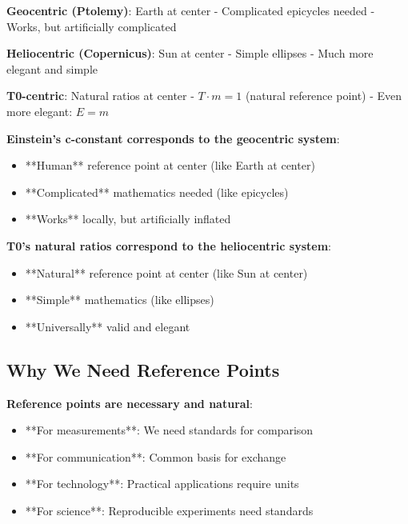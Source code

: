 \documentclass[12pt,a4paper]{article}
\newcommand{\Tfield}{T}
\begin{document}
{{{{{						\begin{tcolorbox}[colback=blue!5!white,colframe=blue!75!black,title=The Reference Point Revolution: From Earth → Sun → Nature]
							\textbf{Geocentric (Ptolemy)}: Earth at center
							- Complicated epicycles needed
							- Works, but artificially complicated
							
							\textbf{Heliocentric (Copernicus)}: Sun at center  
							- Simple ellipses
							- Much more elegant and simple
							
							\textbf{T0-centric}: Natural ratios at center
							- $\Tfield \cdot m = 1$ (natural reference point)
							- Even more elegant: $E = m$
						\end{tcolorbox}
						
						\textbf{Einstein's c-constant corresponds to the geocentric system}:
						\begin{itemize}
							\item **Human** reference point at center (like Earth at center)
							\item **Complicated** mathematics needed (like epicycles)
							\item **Works** locally, but artificially inflated
						\end{itemize}
						
						\textbf{T0's natural ratios correspond to the heliocentric system}:
						\begin{itemize}
							\item **Natural** reference point at center (like Sun at center)
							\item **Simple** mathematics (like ellipses)
							\item **Universally** valid and elegant
						\end{itemize}
						
						\subsection{Why We Need Reference Points}
						
						\textbf{Reference points are necessary and natural}:
						\begin{itemize}
							\item **For measurements**: We need standards for comparison
							\item **For communication**: Common basis for exchange
							\item **For technology**: Practical applications require units
							\item **For science**: Reproducible experiments need standards
						\end{itemize}
						
}}}}}
\end{document}
